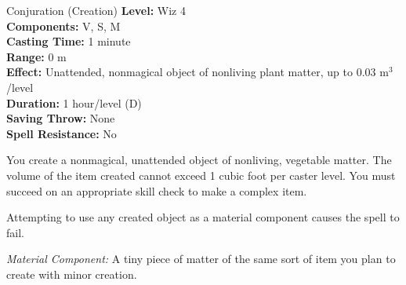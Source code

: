 {Conjuration (Creation)}
{
	\textbf{Level:}
	Wiz 4\\
	\textbf{Components:}
	V, S, M\\
	\textbf{Casting Time:}
	1 minute\\
	\textbf{Range:}
	0 m\\
	\textbf{Effect:}
	Unattended, nonmagical object of nonliving plant matter, up to 0.03 m$^3$/level\\
	\textbf{Duration:}
	1 hour/level (D)\\
	\textbf{Saving Throw:}
	None\\
	\textbf{Spell Resistance:}
	No\\
}
{
	You create a nonmagical, unattended object of nonliving, vegetable matter. The volume of the item created cannot exceed 1 cubic foot per caster level. You must succeed on an appropriate skill check to make a complex item.

	Attempting to use any created object as a material component causes the spell to fail.

	\textit{Material Component:}
	A tiny piece of matter of the same sort of item you plan to create with minor creation.

}
